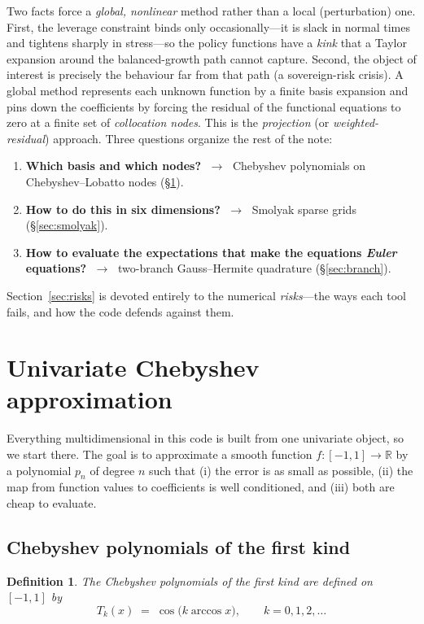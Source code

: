 \documentclass[11pt]{article}
\newtheorem{definition}{Definition}
\newcommand{\R}{\mathbb{R}}
\newcommand{\Tcheb}{T}
\begin{document}
Two facts force a \emph{global, nonlinear} method rather than a local
(perturbation) one. First, the leverage constraint binds only
occasionally---it is slack in normal times and tightens sharply in
stress---so the policy functions have a \emph{kink} that a Taylor expansion
around the balanced-growth path cannot capture. Second, the object of
interest is precisely the behaviour far from that path (a sovereign-risk
crisis). A global method represents each unknown function by a finite basis
expansion and pins down the coefficients by forcing the residual of the
functional equations to zero at a finite set of \emph{collocation nodes}.
This is the \emph{projection} (or \emph{weighted-residual}) approach. Three
questions organize the rest of the note:

\begin{enumerate}
\item \textbf{Which basis and which nodes?} $\;\to\;$ Chebyshev polynomials
      on Chebyshev--Lobatto nodes (\S\ref{sec:cheb}).
\item \textbf{How to do this in six dimensions?} $\;\to\;$ Smolyak sparse
      grids (\S\ref{sec:smolyak}).
\item \textbf{How to evaluate the expectations that make the equations
      \emph{Euler} equations?} $\;\to\;$ two-branch Gauss--Hermite quadrature
      (\S\ref{sec:branch}).
\end{enumerate}

\noindent Section~\ref{sec:risks} is devoted entirely to the numerical
\emph{risks}---the ways each tool fails, and how the code defends against
them.


\section{Univariate Chebyshev approximation}
\label{sec:cheb}

Everything multidimensional in this code is built from one univariate
object, so we start there. The goal is to approximate a smooth function
$f:[-1,1]\to\R$ by a polynomial $p_n$ of degree $n$ such that (i) the error
is as small as possible, (ii) the map from function values to coefficients
is well conditioned, and (iii) both are cheap to evaluate.

\subsection{Chebyshev polynomials of the first kind}

\begin{definition}
The Chebyshev polynomials of the first kind are defined on $[-1,1]$ by
\[
\Tcheb_k(x) \;=\; \cos\!\big(k\arccos x\big), \qquad k=0,1,2,\dots
\]
\end{definition}
\end{document}
